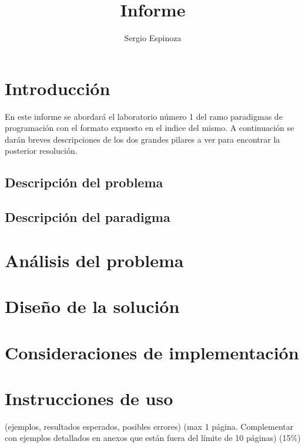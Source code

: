 \documentclass[10pt,letterpaper,openany]{article}
\title{Informe}
\author{Sergio Espinoza}
\begin{document}
    
    
    
    \tableofcontents
    \newpage


    
    \section{Introducción}
    En este informe se abordará el laboratorio número 1 del ramo paradigmas de programación
    con el formato expuesto en el indice del mismo. A continuación se darán breves descripciones
    de los dos grandes pilares a ver para encontrar la posterior resolución.  
        \subsection{Descripción del problema}
            
        \subsection{Descripción del paradigma}
            


    \section{Análisis del problema}
        

    \section{Diseño de la solución}
        

    \section{Consideraciones de implementación}
        

    \section{Instrucciones de uso}
    (ejemplos, resultados esperados, posibles errores) (max 1 página. Complementar con ejemplos detallados en anexos que están fuera del límite de 10 páginas) (15\%)
\end{document}
